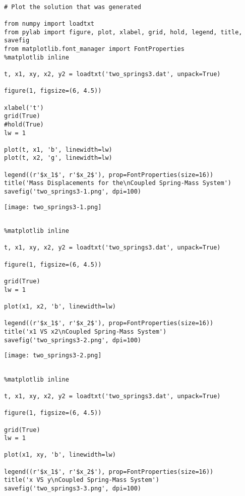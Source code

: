 \documentclass{article} %
\begin{document}
\begin{verbatim} 

# Plot the solution that was generated

from numpy import loadtxt
from pylab import figure, plot, xlabel, grid, hold, legend, title, savefig
from matplotlib.font_manager import FontProperties
%matplotlib inline

t, x1, xy, x2, y2 = loadtxt('two_springs3.dat', unpack=True)

figure(1, figsize=(6, 4.5))

xlabel('t')
grid(True)
#hold(True)
lw = 1

plot(t, x1, 'b', linewidth=lw)
plot(t, x2, 'g', linewidth=lw)

legend((r'$x_1$', r'$x_2$'), prop=FontProperties(size=16))
title('Mass Displacements for the\nCoupled Spring-Mass System')
savefig('two_springs3-1.png', dpi=100)

\end{verbatim}



\begin{center}
 	\texttt{[image: two\_springs3-1.png]}
 \end{center}



\begin{verbatim} 

%matplotlib inline

t, x1, xy, x2, y2 = loadtxt('two_springs3.dat', unpack=True)

figure(1, figsize=(6, 4.5))

grid(True)
lw = 1

plot(x1, x2, 'b', linewidth=lw)

legend((r'$x_1$', r'$x_2$'), prop=FontProperties(size=16))
title('x1 VS x2\nCoupled Spring-Mass System')
savefig('two_springs3-2.png', dpi=100)

\end{verbatim}


\begin{center}
 	\texttt{[image: two\_springs3-2.png]}
 \end{center}


\begin{verbatim} 

%matplotlib inline

t, x1, xy, x2, y2 = loadtxt('two_springs3.dat', unpack=True)

figure(1, figsize=(6, 4.5))

grid(True)
lw = 1

plot(x1, xy, 'b', linewidth=lw)

legend((r'$x_1$', r'$x_2$'), prop=FontProperties(size=16))
title('x VS y\nCoupled Spring-Mass System')
savefig('two_springs3-3.png', dpi=100)

\end{verbatim}
\end{document}
